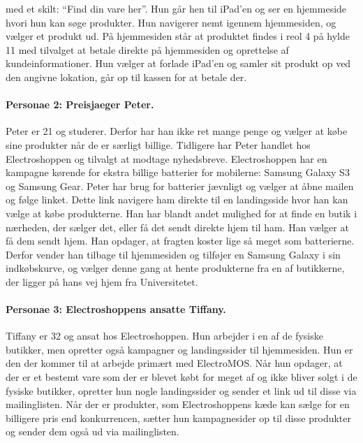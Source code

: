 med et skilt: “Find din vare her”. Hun går hen til iPad’en og ser en hjemmeside hvori hun kan søge produkter. Hun navigerer nemt igennem hjemmesiden, og vælger et produkt ud. På hjemmesiden står at produktet findes i reol 4 på hylde 11 med tilvalget at betale direkte på hjemmesiden og oprettelse af kundeinformationer. Hun vælger at forlade iPad’en og samler sit produkt op ved den angivne lokation, går op til kassen for at betale der.


\paragraph{Personae 2: Preisjaeger Peter.}
Peter er 21 og studerer. Derfor har han ikke ret mange penge og vælger at købe sine produkter når de er særligt billige. Tidligere har Peter handlet hos Electroshoppen og tilvalgt at modtage nyhedsbreve. Electroshoppen har en kampagne kørende for ekstra billige batterier for mobilerne: Samsung Galaxy S3 og Samsung Gear. Peter har brug for batterier jævnligt og vælger at åbne mailen og følge linket. Dette link navigere ham direkte til en landingsside hvor han kan vælge at købe produkterne. Han har blandt andet mulighed for at finde en butik i nærheden, der sælger det, eller få det sendt direkte hjem til ham. Han vælger at få dem sendt hjem. Han opdager, at fragten koster lige så meget som batterierne. Derfor vender han tilbage til hjemmesiden og tilføjer en Samsung Galaxy i sin indkøbskurve, og vælger denne gang at hente produkterne fra en af butikkerne, der ligger på hans vej hjem fra Universitetet.


\paragraph{Personae 3: Electroshoppens ansatte Tiffany.}
Tiffany er 32 og ansat hos Electroshoppen. Hun arbejder i en af de fysiske butikker, men opretter også kampagner og landingssider til hjemmesiden. Hun er den der kommer til at arbejde primært med ElectroMOS. Når hun opdager, at der er et bestemt vare som der er blevet købt for meget af og ikke bliver solgt i de fysiske butikker, opretter hun nogle landingssider og sender et link ud til disse via mailinglisten. Når der er produkter, som Electroshoppens kæde kan sælge for en billigere pris end konkurrencen, sætter hun kampagnesider op til disse produkter og sender dem også ud via mailinglisten.


